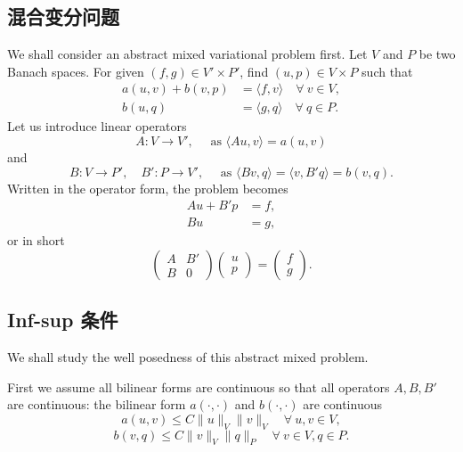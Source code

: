\subsection{混合变分问题}
We shall consider an abstract mixed variational
problem first. Let $V$ and $P$ be two Banach spaces. For given $(f, g)\in V'\times P'$, find
$(u, p)\in V \times P$ such that
\begin{align}
a(u, v)+ b(v, p) & =\langle f, v\rangle \quad \forall~v\in V, \label{abstractmixed1}\\
b(u, q) & =\langle g, q\rangle  \quad \forall~q\in P.\label{abstractmixed2}
\end{align}
Let us introduce linear operators
\[
A : V \to V',\quad \textrm{ as } \langle Au, v\rangle = a(u, v)
\]
and
\[
B: V\to P', \quad B' : P \to V',\quad \textrm{ as } \langle Bv, q\rangle = \langle v, B'q\rangle = b(v, q).
\]
Written in the operator form, the problem becomes
\begin{align}
Au+ B'p & =f, \label{abstractmixedoperator1}\\
Bu & =g, \label{abstractmixedoperator2}
\end{align}
or in short
\begin{equation*}%
\begin{pmatrix}
A &  B' \\
B & 0
\end{pmatrix}
\begin{pmatrix}
u \\ p
\end{pmatrix}
=
\begin{pmatrix}
f \\ g
\end{pmatrix}.
\end{equation*}


\subsection{Inf-sup 条件}

We shall study the well posedness of this abstract mixed problem.

First we assume all bilinear forms are continuous so that all operators $A, B, B'$ are
continuous: the bilinear form $a(\cdot, \cdot)$ and $b(\cdot, \cdot)$ are continuous
\begin{equation}\label{acontinuous}
a(u, v)\leq C\|u\|_V\|v\|_V \quad \forall~ u, v\in V,
\end{equation}
\begin{equation}\label{bcontinuous}
b(v, q)\leq C\|v\|_V\|q\|_P \quad \forall~ v\in V, q\in P.
\end{equation}

